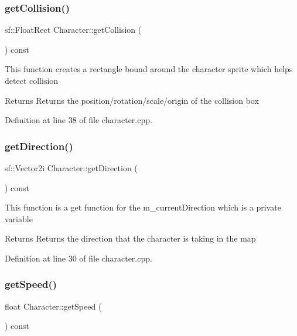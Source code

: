 \subsubsection{\texorpdfstring{get\+Collision()}{getCollision()}}
{\footnotesize\ttfamily sf\+::\+Float\+Rect Character\+::get\+Collision (\begin{DoxyParamCaption}{ }\end{DoxyParamCaption}) const}

This function creates a rectangle bound around the character sprite which helps detect collision

\begin{DoxyReturn}{Returns}
Returns the position/rotation/scale/origin of the collision box 
\end{DoxyReturn}


Definition at line 38 of file character.\+cpp.

\mbox{\label{class_character_ae8147e847ec305534ef4f2652f3541de}} 
\subsubsection{\texorpdfstring{get\+Direction()}{getDirection()}}
{\footnotesize\ttfamily sf\+::\+Vector2i Character\+::get\+Direction (\begin{DoxyParamCaption}{ }\end{DoxyParamCaption}) const}

This function is a get function for the m\+\_\+current\+Direction which is a private variable

\begin{DoxyReturn}{Returns}
Returns the direction that the character is taking in the map 
\end{DoxyReturn}


Definition at line 30 of file character.\+cpp.

\mbox{\label{class_character_afb7791a8c122e8b88244f0a1a54506c0}} 
\subsubsection{\texorpdfstring{get\+Speed()}{getSpeed()}}
{\footnotesize\ttfamily float Character\+::get\+Speed (\begin{DoxyParamCaption}{ }\end{DoxyParamCaption}) const}


